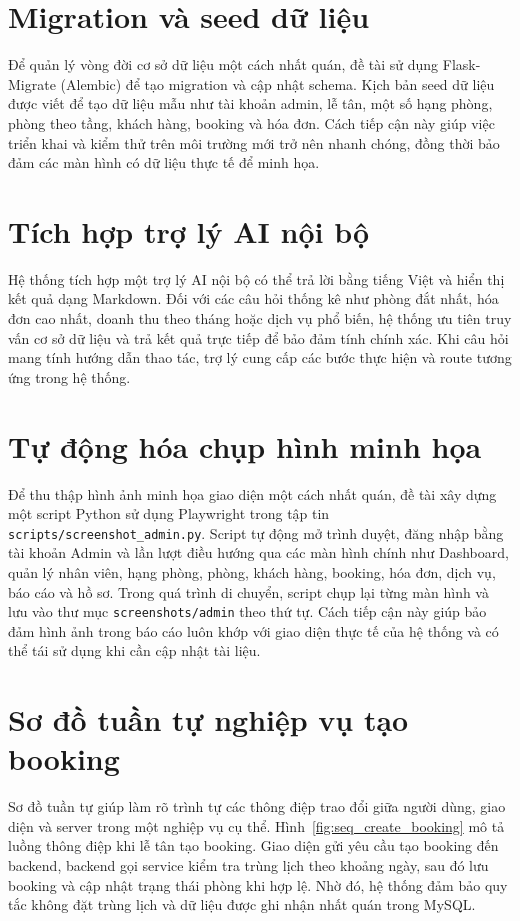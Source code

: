 \documentclass[13pt,a4paper]{extreport}
\begin{document}
\section{Migration và seed dữ liệu}

Để quản lý vòng đời cơ sở dữ liệu một cách nhất quán, đề tài sử dụng Flask-Migrate (Alembic) để tạo migration và cập nhật schema. Kịch bản seed dữ liệu được viết để tạo dữ liệu mẫu như tài khoản admin, lễ tân, một số hạng phòng, phòng theo tầng, khách hàng, booking và hóa đơn. Cách tiếp cận này giúp việc triển khai và kiểm thử trên môi trường mới trở nên nhanh chóng, đồng thời bảo đảm các màn hình có dữ liệu thực tế để minh họa.

\section{Tích hợp trợ lý AI nội bộ}

Hệ thống tích hợp một trợ lý AI nội bộ có thể trả lời bằng tiếng Việt và hiển thị kết quả dạng Markdown. Đối với các câu hỏi thống kê như phòng đắt nhất, hóa đơn cao nhất, doanh thu theo tháng hoặc dịch vụ phổ biến, hệ thống ưu tiên truy vấn cơ sở dữ liệu và trả kết quả trực tiếp để bảo đảm tính chính xác. Khi câu hỏi mang tính hướng dẫn thao tác, trợ lý cung cấp các bước thực hiện và route tương ứng trong hệ thống.

\section{Tự động hóa chụp hình minh họa}

Để thu thập hình ảnh minh họa giao diện một cách nhất quán, đề tài xây dựng một script Python sử dụng Playwright trong tập tin \texttt{scripts/screenshot\_admin.py}. Script tự động mở trình duyệt, đăng nhập bằng tài khoản Admin và lần lượt điều hướng qua các màn hình chính như Dashboard, quản lý nhân viên, hạng phòng, phòng, khách hàng, booking, hóa đơn, dịch vụ, báo cáo và hồ sơ. Trong quá trình di chuyển, script chụp lại từng màn hình và lưu vào thư mục \texttt{screenshots/admin} theo thứ tự. Cách tiếp cận này giúp bảo đảm hình ảnh trong báo cáo luôn khớp với giao diện thực tế của hệ thống và có thể tái sử dụng khi cần cập nhật tài liệu.

\section{Sơ đồ tuần tự nghiệp vụ tạo booking}

Sơ đồ tuần tự giúp làm rõ trình tự các thông điệp trao đổi giữa người dùng, giao diện và server trong một nghiệp vụ cụ thể. Hình~\ref{fig:seq_create_booking} mô tả luồng thông điệp khi lễ tân tạo booking. Giao diện gửi yêu cầu tạo booking đến backend, backend gọi service kiểm tra trùng lịch theo khoảng ngày, sau đó lưu booking và cập nhật trạng thái phòng khi hợp lệ. Nhờ đó, hệ thống đảm bảo quy tắc không đặt trùng lịch và dữ liệu được ghi nhận nhất quán trong MySQL.
\end{document}
